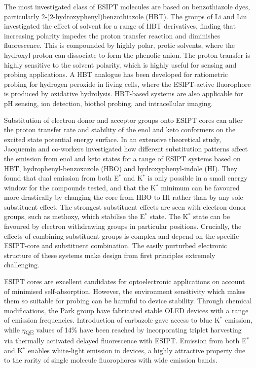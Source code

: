The most investigated class of ESIPT molecules are based on benzothiazole dyes, particularly 2-(2-hydroxyphenyl)benzothiazole (HBT).\cite{Padalkar2015,Kwon2011} The groups of Li and Liu investigated the effect of solvent for a range of HBT derivatives, finding that increasing polarity impedes the proton transfer reaction and diminishes fluorescence. This is compounded by highly polar, protic solvents, where the hydroxyl proton can dissociate to form the phenolic anion. The proton transfer is highly sensitive to the solvent polarity, which is highly useful for sensing and probing applications.\cite{Wang2009,Cheng2015f} A HBT analogue has been developed for ratiometric probing for hydrogen peroxide in living cells, where the ESIPT-active fluorophore is produced by oxidative hydrolysis.\cite{Tang2018a} HBT-based systems are also applicable for pH sensing, ion detection, biothol probing, and intracellular imaging.\cite{Kachwal2018,Kachwal2018,Liu2018}

Substitution of electron donor and acceptor groups onto ESIPT cores can alter the proton transfer rate and stability of the enol and keto conformers on the excited state potential energy surface. In an extensive theoretical study, Jacquemin and co-workers investigated how different substitution patterns affect the emission from enol and keto states for a range of ESIPT systems based on HBT, hydrophenyl-benzoxazole (HBO) and hydroxyphenyl-indole (HI).\cite{Azarias2016} They found that dual emission from both E$^*$ and K$^*$ is only possible in a small energy window for the compounds tested, and that the K$^*$ minimum can be favoured more drastically by changing the core from HBO to HI rather than by any sole substituent effect. The strongest substituent effects are seen with electron donor groups, such as methoxy, which stabilise the E$^*$ state. The K$^*$ state can be favoured by electron withdrawing groups in particular positions. Crucially, the effects of combining substituent groups is complex and depend on the specific ESIPT-core and substituent combination. The easily purturbed electronic structure of these systems make design from first principles extremely challenging.

ESIPT cores are excellent candidates for optoelectronic applications on account of minimised self-absorption. However, the environment sensitivity which makes them so suitable for probing can be harmful to device stability.\cite{Kwon2011} Through chemical modifications, the Park group have fabricated stable OLED devices with a range of emission frequencies.\cite{Park2008,Park2009,Kim2011} Introduction of carbazole gave access to blue K$^*$ emission, while $\eta$\textsubscript{QE} values of 14\% have been reached by incorporating triplet harvesting via thermally activated delayed fluorescence with ESIPT.\cite{Park2008,Mamada2017} Emission from both E$^*$ and K$^*$ enables white-light emission in devices, a highly attractive property due to the rarity of single molecule fluorophores with wide emission bands.\cite{Tang2011,Yao2011,Zhang2016b,Serdiuk2017}

